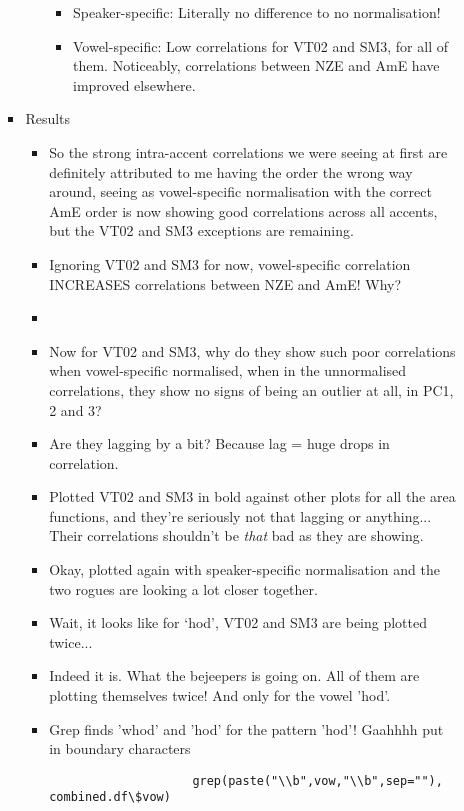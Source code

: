 \documentclass{article}
\begin{document}
\begin{itemize}
\begin{itemize}
\begin{itemize}
\begin{itemize}
\begin{itemize}
                    \item Speaker-specific: Literally no difference to no normalisation!
                    \item Vowel-specific: Low correlations for VT02 and SM3, for all of them. Noticeably, correlations between NZE and AmE have improved elsewhere.
                \end{itemize}
            \end{itemize}
            \item Results
            \begin{itemize}
                \item So the strong intra-accent correlations we were seeing at first are definitely attributed to me having the order the wrong way around, seeing as vowel-specific normalisation with the correct AmE order is now showing good correlations across all accents, but the VT02 and SM3 exceptions are remaining.
                \item Ignoring VT02 and SM3 for now, vowel-specific correlation INCREASES correlations between NZE and AmE! Why?
                \item 
                \item Now for VT02 and SM3, why do they show such poor correlations when vowel-specific normalised, when in the unnormalised correlations, they show no signs of being an outlier at all, in PC1, 2 and 3?
                \item Are they lagging by a bit? Because lag = huge drops in correlation.
                \item Plotted VT02 and SM3 in bold against other plots for all the area functions, and they're seriously not that lagging or anything... Their correlations shouldn't be \textit{that} bad as they are showing.
                \item Okay, plotted again with speaker-specific normalisation and the two rogues are looking a lot closer together.
                \item Wait, it looks like for `hod', VT02 and SM3 are being plotted twice... 
                \item Indeed it is. What the bejeepers is going on. All of them are plotting themselves twice! And only for the vowel 'hod'.
                \item Grep finds 'whod' and 'hod' for the pattern 'hod'! Gaahhhh put in boundary characters \begin{verbatim}
                    grep(paste("\\b",vow,"\\b",sep=""), combined.df\$vow)

\end{verbatim}
\end{itemize}
\end{itemize}
\end{itemize}
\end{itemize}
\end{document}
